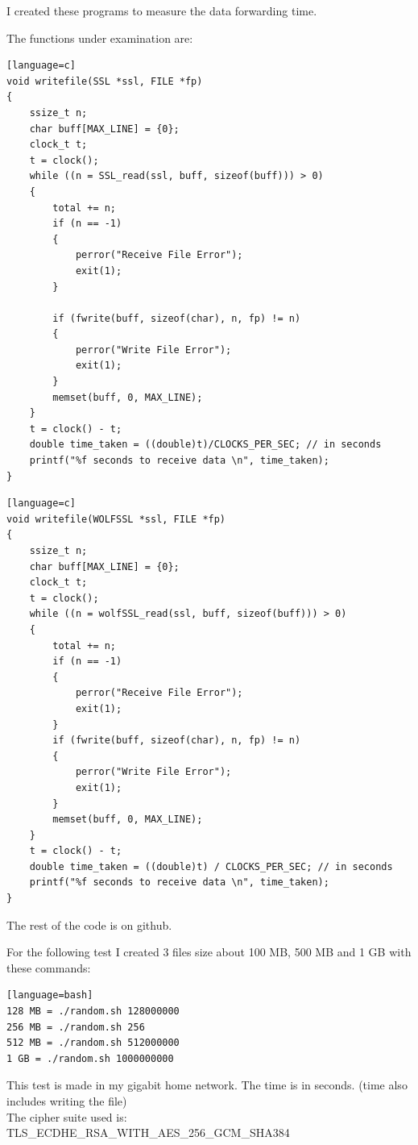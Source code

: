 \documentclass[a4paper,12pt]{article}
\begin{document}
I created these programs to measure the data forwarding time.

The functions under examination are:

\begin{lstlisting}[caption={openSSL function},captionpos=b][language=c]
void writefile(SSL *ssl, FILE *fp)
{
    ssize_t n;
    char buff[MAX_LINE] = {0};
    clock_t t; 
    t = clock(); 
    while ((n = SSL_read(ssl, buff, sizeof(buff))) > 0)
    {
        total += n;
        if (n == -1)
        {
            perror("Receive File Error");
            exit(1);
        }

        if (fwrite(buff, sizeof(char), n, fp) != n)
        {
            perror("Write File Error");
            exit(1);
        }
        memset(buff, 0, MAX_LINE);
    }
    t = clock() - t; 
    double time_taken = ((double)t)/CLOCKS_PER_SEC; // in seconds 
    printf("%f seconds to receive data \n", time_taken); 
}
\end{lstlisting}

\begin{lstlisting}[caption={wolfSSL function},captionpos=b][language=c]
void writefile(WOLFSSL *ssl, FILE *fp)
{
    ssize_t n;
    char buff[MAX_LINE] = {0};
    clock_t t;
    t = clock();
    while ((n = wolfSSL_read(ssl, buff, sizeof(buff))) > 0)
    {
        total += n;
        if (n == -1)
        {
            perror("Receive File Error");
            exit(1);
        }
        if (fwrite(buff, sizeof(char), n, fp) != n)
        {
            perror("Write File Error");
            exit(1);
        }
        memset(buff, 0, MAX_LINE);
    }
    t = clock() - t;
    double time_taken = ((double)t) / CLOCKS_PER_SEC; // in seconds
    printf("%f seconds to receive data \n", time_taken);
}
\end{lstlisting}
The rest of the code is on github.

For the following test I created 3 files size about 100 MB, 500 MB and 1 GB with these commands:
\begin{lstlisting}[caption={openSSL commands},captionpos=b][language=bash]
128 MB = ./random.sh 128000000
256 MB = ./random.sh 256
512 MB = ./random.sh 512000000
1 GB = ./random.sh 1000000000
\end{lstlisting}

This test is made in my gigabit home network.
The time is in seconds. (time also includes writing the file)
\\The cipher suite used is: TLS\_ECDHE\_RSA\_WITH\_AES\_256\_GCM\_SHA384
\end{document}
